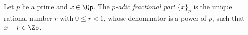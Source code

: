 Let $p$ be a prime and $x\in\Qp$. The \emph{$p$-adic fractional part} $\{x\}_p$ is the unique rational number $r$
with $0\le r<1$, whose denominator is a power of $p$, such that $x-r\in\Zp$.
